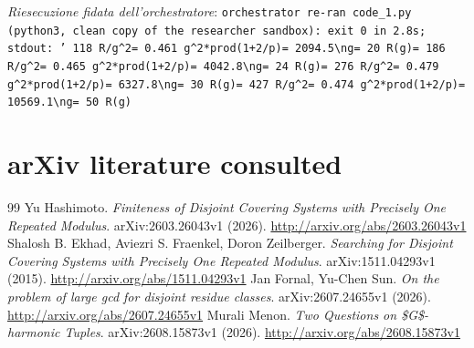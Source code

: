 \documentclass[11pt,a4paper]{article}
\begin{document}
\noindent\emph{Riesecuzione fidata dell'orchestratore}: \texttt{orchestrator re-ran code\_1.py (python3, clean copy of the researcher sandbox): exit 0 in 2.8s; stdout: '  118  R/g\textasciicircum{}2=   0.461  g\textasciicircum{}2*prod(1+2/p)=        2094.5\textbackslash{}ng=   20  R(g)=         186  R/g\textasciicircum{}2=   0.465  g\textasciicircum{}2*prod(1+2/p)=        4042.8\textbackslash{}ng=   24  R(g)=         276  R/g\textasciicircum{}2=   0.479  g\textasciicircum{}2*prod(1+2/p)=        6327.8\textbackslash{}ng=   30  R(g)=         427  R/g\textasciicircum{}2=   0.474  g\textasciicircum{}2*prod(1+2/p)=       10569.1\textbackslash{}ng=   50  R(g)}

\section{arXiv literature consulted}
\begin{thebibliography}{99}
 Yu Hashimoto. \emph{Finiteness of Disjoint Covering Systems with Precisely One Repeated Modulus}. arXiv:2603.26043v1 (2026). \url{http://arxiv.org/abs/2603.26043v1}
 Shalosh B. Ekhad, Aviezri S. Fraenkel, Doron Zeilberger. \emph{Searching for Disjoint Covering Systems with Precisely One Repeated Modulus}. arXiv:1511.04293v1 (2015). \url{http://arxiv.org/abs/1511.04293v1}
 Jan Fornal, Yu-Chen Sun. \emph{On the problem of large gcd for disjoint residue classes}. arXiv:2607.24655v1 (2026). \url{http://arxiv.org/abs/2607.24655v1}
 Murali Menon. \emph{Two Questions on \$G\$-harmonic Tuples}. arXiv:2608.15873v1 (2026). \url{http://arxiv.org/abs/2608.15873v1}
\end{thebibliography}
\end{document}
